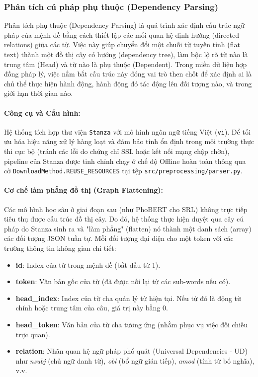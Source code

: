 \subsubsection{Phân tích cú pháp phụ thuộc (Dependency Parsing)}

Phân tích phụ thuộc (Dependency Parsing) là quá trình xác định cấu trúc ngữ pháp của mệnh đề bằng cách thiết lập các mối quan hệ định hướng (directed relations) giữa các từ. Việc này giúp chuyển đổi một chuỗi từ tuyến tính (flat text) thành một đồ thị cây có hướng (dependency tree), làm bộc lộ rõ từ nào là trung tâm (Head) và từ nào là phụ thuộc (Dependent). Trong miền dữ liệu hợp đồng pháp lý, việc nắm bắt cấu trúc này đóng vai trò then chốt để xác định ai là chủ thể thực hiện hành động, hành động đó tác động lên đối tượng nào, và trong giới hạn thời gian nào.

\paragraph{Công cụ và Cấu hình:}
Hệ thống tích hợp thư viện \texttt{Stanza} với mô hình ngôn ngữ tiếng Việt (\texttt{vi}). Để tối ưu hóa hiệu năng xử lý hàng loạt và đảm bảo tính ổn định trong môi trường thực thi cục bộ (tránh các lỗi do chứng chỉ SSL hoặc kết nối mạng chập chờn), pipeline của Stanza được tinh chỉnh chạy ở chế độ Offline hoàn toàn thông qua cờ \texttt{DownloadMethod.REUSE\_RESOURCES} tại tệp \texttt{src/preprocessing/parser.py}.

\paragraph{Cơ chế làm phẳng đồ thị (Graph Flattening):}
Các mô hình học sâu ở giai đoạn sau (như PhoBERT cho SRL) không trực tiếp tiêu thụ được cấu trúc đồ thị cây. Do đó, hệ thống thực hiện duyệt qua cây cú pháp do Stanza sinh ra và "làm phẳng" (flatten) nó thành một danh sách (array) các đối tượng JSON tuần tự. Mỗi đối tượng đại diện cho một token với các trường thông tin không gian chi tiết:
\begin{itemize}
    \item \textbf{id}: Index của từ trong mệnh đề (bắt đầu từ 1).
    \item \textbf{token}: Văn bản gốc của từ (đã được nối lại từ các sub-words nếu có).
    \item \textbf{head\_index}: Index của từ cha quản lý từ hiện tại. Nếu từ đó là động từ chính hoặc trung tâm của câu, giá trị này bằng 0.
    \item \textbf{head\_token}: Văn bản của từ cha tương ứng (nhằm phục vụ việc đối chiếu trực quan).
    \item \textbf{relation}: Nhãn quan hệ ngữ pháp phổ quát (Universal Dependencies - UD) như \textit{nsubj} (chủ ngữ danh từ), \textit{obl} (bổ ngữ gián tiếp), \textit{amod} (tính từ bổ nghĩa), v.v.
\end{itemize}

